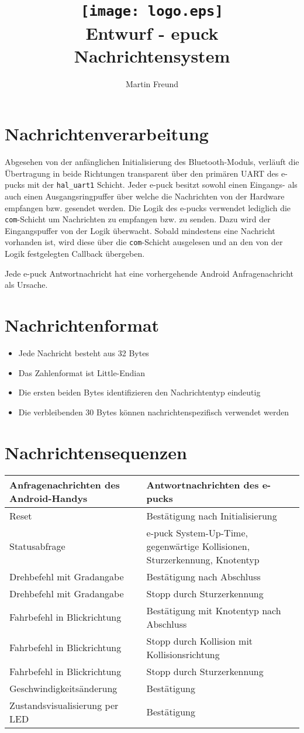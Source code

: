 \documentclass[10pt,a4paper]{article}
\title{
	\texttt{[image: logo.eps]} \\
	\vspace{1cm}
	Entwurf - epuck Nachrichtensystem
}
\author{Martin Freund}
\begin{document}
	\section{Nachrichtenverarbeitung}
		{Abgesehen von der anfänglichen Initialisierung des Bluetooth-Moduls, verläuft die Übertragung in beide
		Richtungen transparent über den primären UART des e-pucks mit der {\tt hal\_uart1} Schicht. Jeder e-puck besitzt
		sowohl einen Eingangs- als auch	einen Ausgangsringpuffer über welche die Nachrichten von der Hardware empfangen
		bzw. gesendet werden. Die Logik des e-pucks verwendet lediglich die {\tt com}-Schicht um Nachrichten zu
		empfangen bzw. zu senden. Dazu wird der Eingangspuffer von der Logik überwacht. Sobald mindestens eine Nachricht
		vorhanden ist, wird diese über die	{\tt com}-Schicht ausgelesen und an den von der Logik festgelegten Callback
		übergeben.

		Jede e-puck Antwortnachricht hat eine vorhergehende Android Anfragenachricht als Ursache.}
	\section{Nachrichtenformat}
		\begin{itemize}
			\item Jede Nachricht besteht aus 32 Bytes
			\item Das Zahlenformat ist Little-Endian
			\item Die ersten beiden Bytes identifizieren den Nachrichtentyp eindeutig
			\item Die verbleibenden 30 Bytes können nachrichtenspezifisch verwendet werden
		\end{itemize}
	\section{Nachrichtensequenzen}	
		\begin{tabular}{|l|l|}
			\hline {\bf Anfragenachrichten des Android-Handys} & {\bf Antwortnachrichten des e-pucks} \\
			\hline Reset & Bestätigung nach Initialisierung \\
			\hline Statusabfrage & e-puck System-Up-Time, gegenwärtige Kollisionen, Sturzerkennung, Knotentyp \\
			\hline Drehbefehl mit Gradangabe & Bestätigung nach Abschluss \\
			\hline Drehbefehl mit Gradangabe & Stopp durch Sturzerkennung \\
			\hline Fahrbefehl in Blickrichtung & Bestätigung mit Knotentyp nach Abschluss \\
			\hline Fahrbefehl in Blickrichtung & Stopp durch Kollision mit Kollisionsrichtung \\
			\hline Fahrbefehl in Blickrichtung & Stopp durch Sturzerkennung \\
			\hline Geschwindigkeitsänderung & Bestätigung \\
			\hline Zustandsvisualisierung per LED & Bestätigung \\
			\hline 
		\end{tabular}
\end{document}
